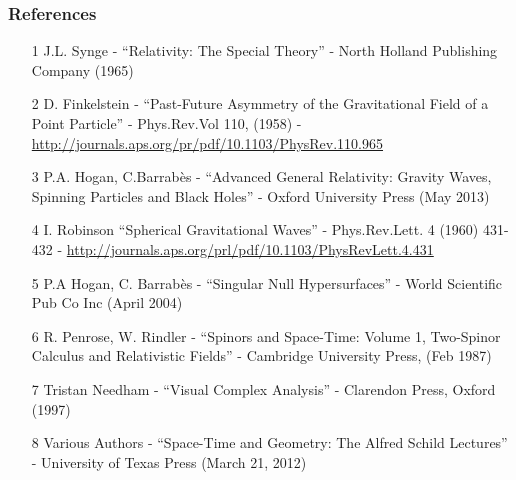 \documentclass[10pt,a4paper]{beamer}
\begin{document}
%

\begin{frame}
\frametitle{References}
\begin{itemize}
\item[1]{ J.L. Synge - ``Relativity: The Special Theory'' - North Holland Publishing Company (1965)}
\item[2]{ D. Finkelstein - ``Past-Future Asymmetry of the Gravitational Field of a Point Particle'' - Phys.Rev.Vol 110, (1958) - \url{http://journals.aps.org/pr/pdf/10.1103/PhysRev.110.965}}
\item[3]{ P.A. Hogan, C.Barrab\`es - ``Advanced General Relativity: Gravity Waves, Spinning Particles and Black Holes'' - Oxford University Press (May 2013)}
\item[4]{ I. Robinson ``Spherical Gravitational Waves'' - Phys.Rev.Lett. 4 (1960) 431-432 - \url{http://journals.aps.org/prl/pdf/10.1103/PhysRevLett.4.431}}
\item[5]{ P.A Hogan, C. Barrab\`es - ``Singular Null Hypersurfaces'' - World Scientific Pub Co Inc (April 2004)}
\item[6]{ R. Penrose, W. Rindler - ``Spinors and Space-Time: Volume 1, Two-Spinor Calculus and Relativistic Fields'' - Cambridge University Press, (Feb 1987)}
\item[7]{ Tristan Needham - ``Visual Complex Analysis'' - Clarendon Press, Oxford (1997)}
\item[8]{ Various Authors - ``Space-Time and Geometry: The Alfred Schild Lectures'' - University of Texas Press (March 21, 2012)}
\end{itemize}
\end{frame}
\end{document}
